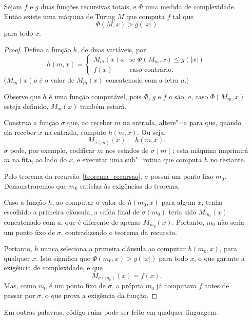 \begin{proposition}
    Sejam $f$ e $g$ duas funções recursivas totais,
    e $\Phi$ uma medida de complexidade.
    Então existe uma máquina de Turing $M$ que computa $f$
    tal que
    \begin{equation*}
        \Phi(M, x) > g(|x|)
    \end{equation*}
    para todo $x$.
    \label{desperdicio_recursos}
\end{proposition}

\begin{proof}
    Defina a função $h$, de duas variáveis, por
    \begin{equation*}
        h(m, x) = \begin{cases}
            M_m(x) a & \text{se $\Phi(M_m, x) \leq g(|x|)$} \\
            f(x) & \text{caso contrário.}
        \end{cases}
    \end{equation*}
    ($M_m(x)a$ é o valor de $M_m(x)$ concatenado com a letra $a$.)

    Observe que $h$ é uma função computável,
    pois $\Phi$, $g$ e $f$ o são,
    e, caso $\Phi(M_m, x)$ esteja definido,
    $M_m(x)$ também estará.

    Construa a função $\sigma$ que,
    ao receber $m$ na entrada,
    altere"=a para que,
    quando ela receber $x$ na entrada,
    compute $h(m, x)$.
    Ou seja,
    \begin{equation*}
        M_{\sigma(m)}(x) = h(m, x).
    \end{equation*}
    $\sigma$ pode, por exemplo,
    codificar $m$ nos estados de $\sigma(m)$;
    esta máquina imprimirá $m$ na fita,
    ao lado do $x$,
    e executar uma sub"=rotina que computa $h$ no restante.

    Pelo teorema da recursão~\ref{teorema_recursao},
    $\sigma$ possui um ponto fixo $m_0$.
    Demonstraremos que $m_0$ satisfaz às exigências do teorema.

    Caso a função $h$, ao computar o valor de $h(m_0, x)$
    para algum $x$,
    tenha escolhido a primeira cláusula,
    a saída final de $\sigma(m_0)$ teria sido
    $M_{m_0} (x)$ concatenado com $a$,
    que é diferente de apenas $M_{m_0}(x)$.
    Portanto, $m_0$ não seria um ponto fixo de $\sigma$,
    contradizendo o teorema da recursão.

    Portanto, $h$ nunca seleciona a primeira cláusula
    ao computar $h(m_0, x)$, para qualquer $x$.
    Isto significa que $\Phi(m_0, x) > g(|x|)$ para todo $x$,
    o que garante a exigência de complexidade,
    e que
    \begin{equation*}
        M_{\sigma(m_0)}(x) = f(x).
    \end{equation*}
    Mas, como $m_0$ é um ponto fixo de $\sigma$,
    a própria $m_0$ já computava $f$ antes de passar por $\sigma$,
    o que prova a exigência da função.
\end{proof}

Em outras palavras,
código ruim pode ser feito em qualquer linguagem.
